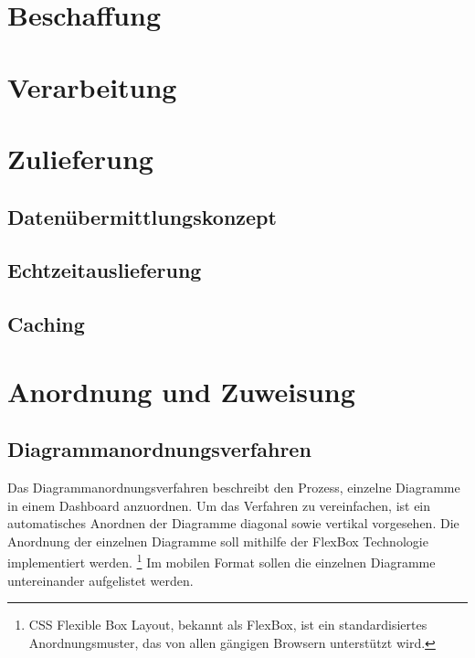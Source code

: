 \section{Beschaffung}
\label{sec:beschaffung}


\section{Verarbeitung}
\label{sec:verarbeitung}


\section{Zulieferung}
\label{sec:zulieferung}

\subsection{Datenübermittlungskonzept}
\label{subsec:datenuebermittlungskonzept}


\subsection{Echtzeitauslieferung}
\label{subsec:echtzeitauslieferung}


\subsection{Caching}
\label{subsec:caching}

\section{Anordnung und Zuweisung}
\label{sec:andordnungundzuweisung}

\subsection{Diagrammanordnungsverfahren}
\label{subsec:diagrammanordnungsverfahren}
Das Diagrammanordnungsverfahren beschreibt den Prozess, einzelne Diagramme in einem Dashboard anzuordnen.
Um das Verfahren zu vereinfachen, ist ein automatisches Anordnen der Diagramme diagonal sowie vertikal vorgesehen.
Die Anordnung der einzelnen Diagramme soll mithilfe der FlexBox Technologie implementiert werden.
\footnote{CSS Flexible Box Layout, bekannt als FlexBox, ist ein standardisiertes Anordnungsmuster, das von allen gängigen Browsern unterstützt wird.\cite{CanIUseFlexBox}}
Im mobilen Format sollen die einzelnen Diagramme untereinander aufgelistet werden. 

